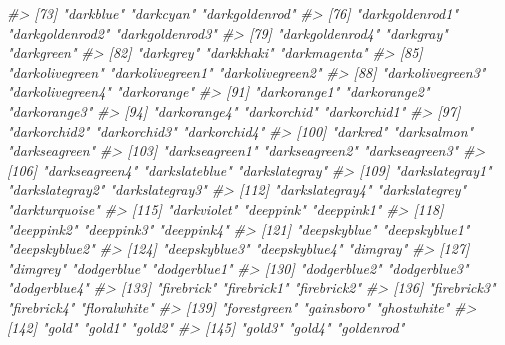 \documentclass[
]{book}
\newenvironment{Shaded}{\begin{snugshade}}{\end{snugshade}}
\newcommand{\CommentTok}[1]{\textcolor[rgb]{0.56,0.35,0.01}{\textit{#1}}}
\begin{document}
\begin{Shaded}
\begin{Highlighting}[]
\CommentTok{\#\textgreater{}  [73] "darkblue"             "darkcyan"             "darkgoldenrod"       }
\CommentTok{\#\textgreater{}  [76] "darkgoldenrod1"       "darkgoldenrod2"       "darkgoldenrod3"      }
\CommentTok{\#\textgreater{}  [79] "darkgoldenrod4"       "darkgray"             "darkgreen"           }
\CommentTok{\#\textgreater{}  [82] "darkgrey"             "darkkhaki"            "darkmagenta"         }
\CommentTok{\#\textgreater{}  [85] "darkolivegreen"       "darkolivegreen1"      "darkolivegreen2"     }
\CommentTok{\#\textgreater{}  [88] "darkolivegreen3"      "darkolivegreen4"      "darkorange"          }
\CommentTok{\#\textgreater{}  [91] "darkorange1"          "darkorange2"          "darkorange3"         }
\CommentTok{\#\textgreater{}  [94] "darkorange4"          "darkorchid"           "darkorchid1"         }
\CommentTok{\#\textgreater{}  [97] "darkorchid2"          "darkorchid3"          "darkorchid4"         }
\CommentTok{\#\textgreater{} [100] "darkred"              "darksalmon"           "darkseagreen"        }
\CommentTok{\#\textgreater{} [103] "darkseagreen1"        "darkseagreen2"        "darkseagreen3"       }
\CommentTok{\#\textgreater{} [106] "darkseagreen4"        "darkslateblue"        "darkslategray"       }
\CommentTok{\#\textgreater{} [109] "darkslategray1"       "darkslategray2"       "darkslategray3"      }
\CommentTok{\#\textgreater{} [112] "darkslategray4"       "darkslategrey"        "darkturquoise"       }
\CommentTok{\#\textgreater{} [115] "darkviolet"           "deeppink"             "deeppink1"           }
\CommentTok{\#\textgreater{} [118] "deeppink2"            "deeppink3"            "deeppink4"           }
\CommentTok{\#\textgreater{} [121] "deepskyblue"          "deepskyblue1"         "deepskyblue2"        }
\CommentTok{\#\textgreater{} [124] "deepskyblue3"         "deepskyblue4"         "dimgray"             }
\CommentTok{\#\textgreater{} [127] "dimgrey"              "dodgerblue"           "dodgerblue1"         }
\CommentTok{\#\textgreater{} [130] "dodgerblue2"          "dodgerblue3"          "dodgerblue4"         }
\CommentTok{\#\textgreater{} [133] "firebrick"            "firebrick1"           "firebrick2"          }
\CommentTok{\#\textgreater{} [136] "firebrick3"           "firebrick4"           "floralwhite"         }
\CommentTok{\#\textgreater{} [139] "forestgreen"          "gainsboro"            "ghostwhite"          }
\CommentTok{\#\textgreater{} [142] "gold"                 "gold1"                "gold2"               }
\CommentTok{\#\textgreater{} [145] "gold3"                "gold4"                "goldenrod"           }

\end{Highlighting}
\end{Shaded}
\end{document}
